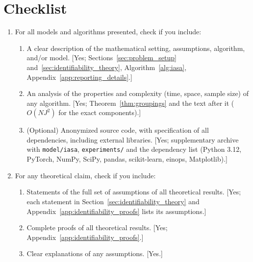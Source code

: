 \section*{Checklist}

\begin{enumerate}

  \item For all models and algorithms presented, check if you include:
  \begin{enumerate}
    \item A clear description of the mathematical setting, assumptions, algorithm,
    and/or model. [Yes; Sections~\ref{sec:problem_setup}
    and~\ref{sec:identifiability_theory}, Algorithm~\ref{alg:iasa},
    Appendix~\ref{app:reporting_details}.]
    \item An analysis of the properties and complexity (time, space, sample size) of
    any algorithm. [Yes; Theorem~\ref{thm:groupings} and the text after it
    (\(O(NJ^2)\) for the exact components).]
    \item (Optional) Anonymized source code, with specification of all dependencies,
    including external libraries. [Yes; supplementary archive with
    \texttt{model/iasa}, \texttt{experiments/} and the dependency list (Python 3.12,
    PyTorch, NumPy, SciPy, pandas, scikit-learn, einops, Matplotlib).]
  \end{enumerate}

  \item For any theoretical claim, check if you include:
  \begin{enumerate}
    \item Statements of the full set of assumptions of all theoretical results. [Yes;
    each statement in Section~\ref{sec:identifiability_theory} and
    Appendix~\ref{app:identifiability_proofs} lists its assumptions.]
    \item Complete proofs of all theoretical results. [Yes;
    Appendix~\ref{app:identifiability_proofs}.]
    \item Clear explanations of any assumptions. [Yes.]
  \end{enumerate}


\end{enumerate}
